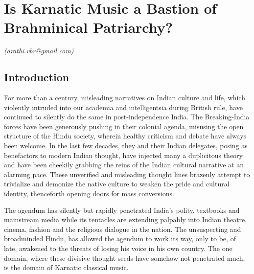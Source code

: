 
\chapter{Is Karnatic Music a Bastion of Brahminical Patriarchy?}\label{chapter7}


\vspace{-.3cm}


\begin{flushright}
\textit{(arathi.vbr@gmail.com)}
\end{flushright}

\vspace{-.3cm}

\section*{Introduction}

\vspace{-.2cm}

For more than a century, misleading narratives on Indian culture and life, which violently intruded into our academia and intelligentsia during British rule, have continued to silently do the same in post-independence India. The Breaking-India forces have been generously pushing in their colonial agenda, misusing the open structure of the Hindu society, wherein healthy criticism and debate have always been welcome. In the last few decades, they and their Indian delegates, posing as benefactors to modern Indian thought, have injected many a duplicitous theory and have been cheekily grabbing the reins of the Indian cultural narrative at an alarming pace. These unverified and misleading thought lines brazenly attempt to trivialize and demonize the native culture to weaken the pride and cultural identity, thenceforth opening doors for mass conversions.

The agendum has silently but rapidly penetrated India’s polity, textbooks and mainstream media while its tentacles are extending palpably into Indian theatre, cinema, fashion and the religious dialogue in the nation. The unsuspecting and broadminded Hindu, has allowed the agendum to work its way, only to be, of late, awakened to the threats of losing his voice in his own country. The one domain, where these divisive thought seeds have somehow not penetrated much, is the domain of Karnatic classical music.


